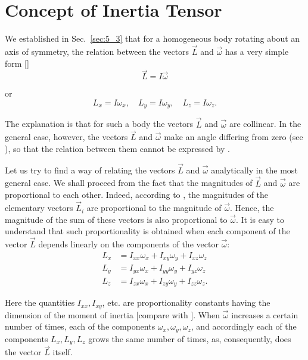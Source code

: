 \section{Concept of Inertia Tensor}\label{sec:5_5}

We established in Sec.~\ref{sec:5_3} that for a homogeneous body rotating about an axis of symmetry, the relation between the vectors $\vec{L}$ and $\vec{\omega}$ has a very simple form []
\begin{equation*}
\vec{L} = I\vec{\omega}
\end{equation*}

\noindent
or
\begin{equation}\label{eq:5_29}
L_x = I\omega_x,\quad L_y = I\omega_y,\quad L_z = I\omega_z.
\end{equation}

\noindent
The explanation is that for such a body the vectors $\vec{L}$ and $\vec{\omega}$ are collinear. In the general case, however, the vectors $\vec{L}$ and $\vec{\omega}$ make an angle differing from zero (see ), so that the relation between them cannot be expressed by .

Let us try to find a way of relating the vectors $\vec{L}$ and $\vec{\omega}$ analytically in the most general case. We shall proceed from the fact that the magnitudes of $\vec{L}$ and $\vec{\omega}$ are proportional to each other. Indeed, according to , the magnitudes of the elementary vectors $\vec{L}_i$ are proportional to the magnitude of $\vec{\omega}$. Hence, the magnitude of the sum of these vectors is also proportional to $\vec{\omega}$. It is easy to understand that such proportionality is obtained when each component of the vector $\vec{L}$ depends linearly on the components of the vector $\vec{\omega}$:
\begin{align}
L_x &= I_{xx}\omega_x + I_{xy}\omega_y + I_{xz}\omega_z\nonumber\\
L_y &= I_{yx}\omega_x + I_{yy}\omega_y + I_{yz}\omega_z\label{eq:5_30}\\
L_z &= I_{zx}\omega_x + I_{zy}\omega_y + I_{zz}\omega_z.\nonumber
\end{align}

\noindent
Here the quantities $I_{xx}, I_{xy}$, etc. are proportionality constants having the dimension of the moment of inertia [compare with ]. When $\vec{\omega}$ increases a certain number of times, each of the components $\omega_x, \omega_y, \omega_z$, and accordingly each of the components $L_x, L_y, L_z$ grows the same number of times, as, consequently, does the vector $\vec{L}$ itself.

